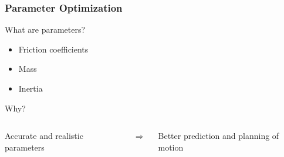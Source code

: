 \begin{frame}[c]
	\frametitle{Parameter Optimization}
		What are parameters?
		\begin{itemize}
			\item{Friction coefficients}
			\item{Mass}
			\item{Inertia}
		\end{itemize}
	\vspace{0.5cm}
		Why?
		\begin{columns}
				\centering
				\begin{tcolorbox}[width=\textwidth,colback={green}]
					Accurate and realistic parameters
				\end{tcolorbox}
				\centering
				\Huge{$\Rightarrow$}
				\begin{tcolorbox}[width=\textwidth,colback={green}]
					Better prediction and planning of motion
				\end{tcolorbox}
		\end{columns}
\end{frame}